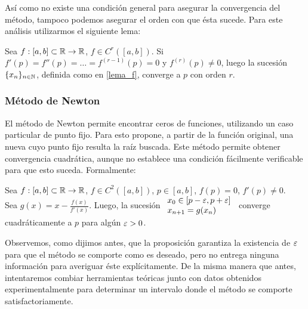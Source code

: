 Así como no existe una condición general para asegurar la convergencia del método, tampoco podemos asegurar el orden con que ésta sucede. Para este análisis utilizarmos el siguiente lema:
\begin{lema}
Sea $f: [a,b] \subset \mathbb{R} \rightarrow \mathbb{R}$, $f \in C^{r}([a,b])$. Si $f'(p) = f''(p) = \dots = f^{(r-1)}(p) = 0$ y $f^{(r)}(p) \neq 0$, luego la sucesión $\{x_n\}_{n\in\mathbb{N}}$, definida como en \ref{lema_f}, converge a $p$ con orden $r$.
\label{lema_conv}
\end{lema}

\subsubsection{Método de Newton}
El método de Newton permite encontrar ceros de funciones, utilizando un caso particular de punto fijo. Para esto propone, a partir de la función original, una nueva cuyo punto fijo resulta la raíz buscada. Este método permite obtener convergencia cuadrática, aunque no establece una condición fácilmente verificable para que esto suceda. Formalmente:
\begin{prop} 
Sea $f: [a,b] \subset \mathbb{R} \rightarrow \mathbb{R}$, $f \in C^{2}([a,b])$, $p\in[a,b]$, $f(p) = 0$, $f'(p) \neq 0$. \\
Sea $g(x) = x - \displaystyle\frac{f(x)}{f'(x)}$. Luego, la sucesión 
	$\begin{array}{l}
		x_0 \in [p-\varepsilon, p+\varepsilon] \\
		x_{n+1} = g(x_n)
	 \end{array}$
converge cuadráticamente a $p$ para algún  $\varepsilon > 0$.
\label{prop_newton}
\end{prop}

Observemos, como dijimos antes, que la proposición garantiza la existencia de $\varepsilon$ para que el método se comporte como es deseado, pero no entrega ninguna información para averiguar éste explícitamente. De la misma manera que antes, intentaremos combiar herramientas teóricas junto con datos obtenidos experimentalmente para determinar un intervalo donde el método se comporte satisfactoriamente.

